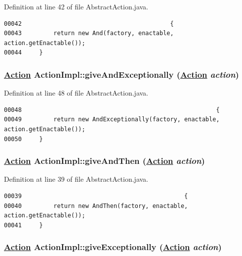 Definition at line 42 of file Abstract\-Action.java.\footnotesize\begin{verbatim}00042                                          {
00043         return new And(factory, enactable, action.getEnactable());
00044     }
\end{verbatim}\normalsize 
\hypertarget{classActionImpl_a6}{
\subsubsection[giveAndExceptionally]{\setlength{\rightskip}{0pt plus 5cm}\hyperlink{interfaceAction}{Action} Action\-Impl::give\-And\-Exceptionally (\hyperlink{interfaceAction}{Action} {\em action})}}
\label{classActionImpl_a6}




Definition at line 48 of file Abstract\-Action.java.\footnotesize\begin{verbatim}00048                                                       {
00049         return new AndExceptionally(factory, enactable, action.getEnactable());
00050     }
\end{verbatim}\normalsize 
\hypertarget{classActionImpl_a3}{
\subsubsection[giveAndThen]{\setlength{\rightskip}{0pt plus 5cm}\hyperlink{interfaceAction}{Action} Action\-Impl::give\-And\-Then (\hyperlink{interfaceAction}{Action} {\em action})}}
\label{classActionImpl_a3}




Definition at line 39 of file Abstract\-Action.java.\footnotesize\begin{verbatim}00039                                              {
00040         return new AndThen(factory, enactable, action.getEnactable());
00041     }
\end{verbatim}\normalsize 
\hypertarget{classActionImpl_a5}{
\subsubsection[giveExceptionally]{\setlength{\rightskip}{0pt plus 5cm}\hyperlink{interfaceAction}{Action} Action\-Impl::give\-Exceptionally (\hyperlink{interfaceAction}{Action} {\em action})}}
\label{classActionImpl_a5}




